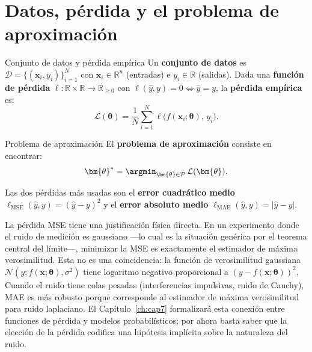 \section{Datos, pérdida y el problema de aproximación}
\label{sec:datos_perdida}


\begin{definicion}{Conjunto de datos y pérdida empírica}
\label{def:datos_loss}
Un \textbf{conjunto de datos} es $\mathcal{D} = \{(\bm{x}_i, y_i)\}_{i=1}^N$
con $\bm{x}_i \in \mathbb{R}^n$ (entradas) e $y_i \in \mathbb{R}$ (salidas).
Dada una \textbf{función de pérdida} $\ell: \mathbb{R} \times \mathbb{R}
\to \mathbb{R}_{\geq 0}$ con $\ell(\hat{y}, y) = 0 \Leftrightarrow
\hat{y} = y$, la \textbf{pérdida empírica} es:
\begin{equation}
  \mathcal{L}(\bm{\theta}) = \frac{1}{N}\sum_{i=1}^N
  \ell\bigl(f(\bm{x}_i;\bm{\theta}),\, y_i\bigr).
  \label{eq:loss_empirica}
\end{equation}
\end{definicion}

\begin{definicion}{Problema de aproximación}
\label{def:problema}
El \textbf{problema de aproximación} consiste en encontrar:
\begin{equation}
  \bm{\theta}^* = \argmin_{\bm{\theta} \in \mathcal{P}}\,
  \mathcal{L}(\bm{\theta}).
  \label{eq:problema_aprox}
\end{equation}
\end{definicion}

Las dos pérdidas más usadas son el \textbf{error cuadrático medio}
$\ell_{\mathrm{MSE}}(\hat{y},y) = (\hat{y}-y)^2$ y el \textbf{error
absoluto medio} $\ell_{\mathrm{MAE}}(\hat{y},y) = |\hat{y}-y|$.

La pérdida MSE tiene una justificación física directa. En un experimento
donde el ruido de medición es gaussiano —lo cual es la situación genérica
por el teorema central del límite—, minimizar la MSE es exactamente el
estimador de máxima verosimilitud. Esta no es una coincidencia: la función
de verosimilitud gaussiana $\mathcal{N}(y; f(\bm{x};\bm{\theta}),
\sigma^2)$ tiene logaritmo negativo proporcional a $(y - f(\bm{x};
\bm{\theta}))^2$. Cuando el ruido tiene colas pesadas (interferencias
impulsivas, ruido de Cauchy), MAE es más robusto porque corresponde
al estimador de máxima verosimilitud para ruido laplaciano. El
Capítulo~\ref{ch:cap7} formalizará esta conexión entre funciones de pérdida y
modelos probabilísticos; por ahora basta saber que la elección de la
pérdida codifica una hipótesis implícita sobre la naturaleza del ruido.

